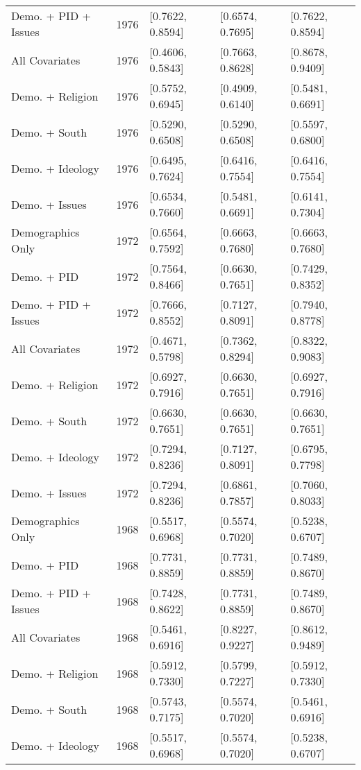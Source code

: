 \begin{longtable}{lrlll}
  Demo. + PID + Issues & 1976 & [0.7622, 0.8594] & [0.6574, 0.7695] & [0.7622, 0.8594] \\ 
  All Covariates & 1976 & [0.4606, 0.5843] & [0.7663, 0.8628] & [0.8678, 0.9409] \\ 
  Demo. + Religion & 1976 & [0.5752, 0.6945] & [0.4909, 0.6140] & [0.5481, 0.6691] \\ 
  Demo. + South & 1976 & [0.5290, 0.6508] & [0.5290, 0.6508] & [0.5597, 0.6800] \\ 
  Demo. + Ideology & 1976 & [0.6495, 0.7624] & [0.6416, 0.7554] & [0.6416, 0.7554] \\ 
  Demo. + Issues & 1976 & [0.6534, 0.7660] & [0.5481, 0.6691] & [0.6141, 0.7304] \\ 
  Demographics Only & 1972 & [0.6564, 0.7592] & [0.6663, 0.7680] & [0.6663, 0.7680] \\ 
  Demo. + PID & 1972 & [0.7564, 0.8466] & [0.6630, 0.7651] & [0.7429, 0.8352] \\ 
  Demo. + PID + Issues & 1972 & [0.7666, 0.8552] & [0.7127, 0.8091] & [0.7940, 0.8778] \\ 
  All Covariates & 1972 & [0.4671, 0.5798] & [0.7362, 0.8294] & [0.8322, 0.9083] \\ 
  Demo. + Religion & 1972 & [0.6927, 0.7916] & [0.6630, 0.7651] & [0.6927, 0.7916] \\ 
  Demo. + South & 1972 & [0.6630, 0.7651] & [0.6630, 0.7651] & [0.6630, 0.7651] \\ 
  Demo. + Ideology & 1972 & [0.7294, 0.8236] & [0.7127, 0.8091] & [0.6795, 0.7798] \\ 
  Demo. + Issues & 1972 & [0.7294, 0.8236] & [0.6861, 0.7857] & [0.7060, 0.8033] \\ 
  Demographics Only & 1968 & [0.5517, 0.6968] & [0.5574, 0.7020] & [0.5238, 0.6707] \\ 
  Demo. + PID & 1968 & [0.7731, 0.8859] & [0.7731, 0.8859] & [0.7489, 0.8670] \\ 
  Demo. + PID + Issues & 1968 & [0.7428, 0.8622] & [0.7731, 0.8859] & [0.7489, 0.8670] \\ 
  All Covariates & 1968 & [0.5461, 0.6916] & [0.8227, 0.9227] & [0.8612, 0.9489] \\ 
  Demo. + Religion & 1968 & [0.5912, 0.7330] & [0.5799, 0.7227] & [0.5912, 0.7330] \\ 
  Demo. + South & 1968 & [0.5743, 0.7175] & [0.5574, 0.7020] & [0.5461, 0.6916] \\ 
  Demo. + Ideology & 1968 & [0.5517, 0.6968] & [0.5574, 0.7020] & [0.5238, 0.6707] \\ 

\end{longtable}
